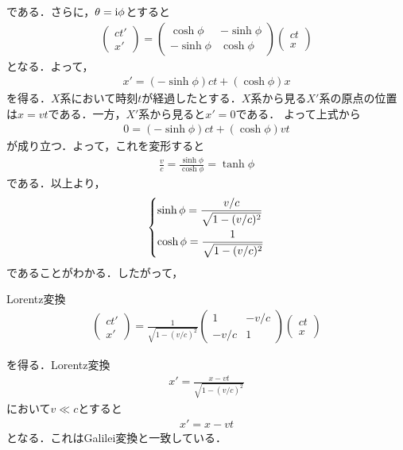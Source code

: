 \documentclass{report}
\begin{document}
  である．さらに，$\theta = \mathrm{i}\phi$とすると
  \begin{align}
    \begin{pmatrix}
      ct' \\ x'
    \end{pmatrix}
    =
    \begin{pmatrix}
      \cosh\phi & -\sinh\phi\\
      -\sinh\phi & \cosh\phi
    \end{pmatrix}
    \begin{pmatrix}
      ct\\x
    \end{pmatrix}
  \end{align}
  となる．よって，
  \begin{align}
    x' = (-\sinh\phi)ct + (\cosh\phi)x
  \end{align}
  を得る．$X$系において時刻$t$が経過したとする．$X$系から見る$X'$系の原点の位置は$x=vt$である．一方，$X'$系から見ると$x'=0$である．
  よって上式から
  \begin{align}
    0 = (-\sinh\phi)ct + (\cosh\phi)vt
  \end{align}
  が成り立つ．よって，これを変形すると
  \begin{align}
    \frac{v}{c} = \frac{\sinh\phi}{\cosh\phi} = \tanh\phi
  \end{align}
  である．以上より，
  \begin{align}
    \begin{dcases}
      \sinh\phi = \frac{v/c}{\sqrt{1- (v/c)^2}}\\
      \cosh\phi = \frac{1}{\sqrt{1- (v/c)^2}}
    \end{dcases}
  \end{align}
  であることがわかる．したがって，
  \begin{itembox}[l]{Lorentz変換}
    \begin{align}
      \label{LorentzTransformation}
      \begin{pmatrix}
        ct' \\ x'
      \end{pmatrix}
      =
      \frac{1}{\sqrt{1 - (v/c)^2}}
      \begin{pmatrix}
        1 & -v/c\\
        -v/c & 1
      \end{pmatrix}
      \begin{pmatrix}
        ct\\x
      \end{pmatrix}
    \end{align}
  \end{itembox}
  を得る．Lorentz変換
  \begin{align}
    x' = \frac{x-vt}{\sqrt{1-(v/c)^2}}
  \end{align}
  において$v \ll c$とすると
  \begin{align}
    x' = x - vt
  \end{align}
  となる．これはGalilei変換と一致している．
\end{document}
